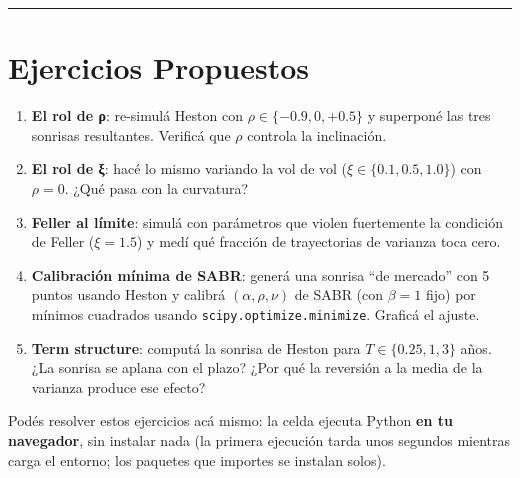\documentclass[
  spanish,
  letterpaper,
  DIV=11,
  numbers=noendperiod]{scrreprt}
\providecommand{\tightlist}{%
  \setlength{\itemsep}{0pt}\setlength{\parskip}{0pt}}
\begin{document}
\begin{center}\rule{0.5\linewidth}{0.5pt}\end{center}

\chapter{Ejercicios Propuestos}\label{ejercicios-propuestos-19}

\begin{tcolorbox}[enhanced jigsaw, bottomrule=.15mm, colback=white, opacitybacktitle=0.6, arc=.35mm, toprule=.15mm, opacityback=0, breakable, titlerule=0mm, left=2mm, coltitle=black, colbacktitle=quarto-callout-important-color!10!white, colframe=quarto-callout-important-color-frame, leftrule=.75mm, toptitle=1mm, bottomtitle=1mm, title=\textcolor{quarto-callout-important-color}{\faExclamation}\hspace{0.5em}{Ejercicios}, rightrule=.15mm]

\begin{enumerate}
\def\labelenumi{\arabic{enumi}.}
\tightlist
\item
  \textbf{El rol de ρ}: re-simulá Heston con
  \(\rho \in \{-0.9, 0, +0.5\}\) y superponé las tres sonrisas
  resultantes. Verificá que \(\rho\) controla la inclinación.
\item
  \textbf{El rol de ξ}: hacé lo mismo variando la vol de vol
  (\(\xi \in \{0.1, 0.5, 1.0\}\)) con \(\rho = 0\). ¿Qué pasa con la
  curvatura?
\item
  \textbf{Feller al límite}: simulá con parámetros que violen
  fuertemente la condición de Feller (\(\xi = 1.5\)) y medí qué fracción
  de trayectorias de varianza toca cero.
\item
  \textbf{Calibración mínima de SABR}: generá una sonrisa ``de mercado''
  con 5 puntos usando Heston y calibrá \((\alpha, \rho, \nu)\) de SABR
  (con \(\beta = 1\) fijo) por mínimos cuadrados usando
  \texttt{scipy.optimize.minimize}. Graficá el ajuste.
\item
  \textbf{Term structure}: computá la sonrisa de Heston para
  \(T \in \{0.25, 1, 3\}\) años. ¿La sonrisa se aplana con el plazo?
  ¿Por qué la reversión a la media de la varianza produce ese efecto?
\end{enumerate}

\end{tcolorbox}

Podés resolver estos ejercicios acá mismo: la celda ejecuta Python
\textbf{en tu navegador}, sin instalar nada (la primera ejecución tarda
unos segundos mientras carga el entorno; los paquetes que importes se
instalan solos).
\end{document}
